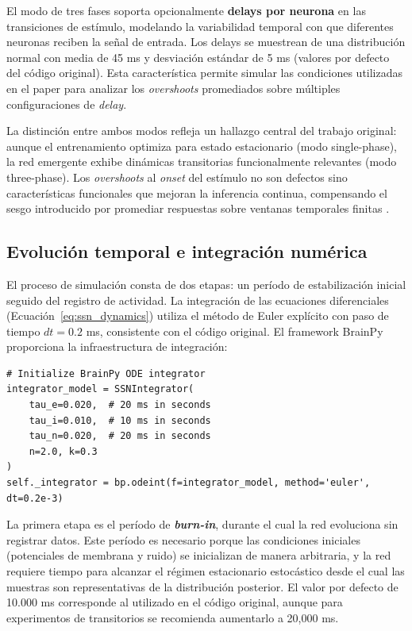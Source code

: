 El modo de tres fases soporta opcionalmente \textbf{delays por neurona} en las transiciones de estímulo, modelando la variabilidad temporal con que diferentes neuronas reciben la señal de entrada. Los delays se muestrean de una distribución normal con media de 45 ms y desviación estándar de 5 ms (valores por defecto del código original). Esta característica permite simular las condiciones utilizadas en el paper para analizar los \textit{overshoots} promediados sobre múltiples configuraciones de \textit{delay}.

La distinción entre ambos modos refleja un hallazgo central del trabajo original: aunque el entrenamiento optimiza para estado estacionario (modo single-phase), la red emergente exhibe dinámicas transitorias funcionalmente relevantes (modo three-phase). Los \textit{overshoots} al \textit{onset} del estímulo no son defectos sino características funcionales que mejoran la inferencia continua, compensando el sesgo introducido por promediar respuestas sobre ventanas temporales finitas \citep{echeveste2020cortical}.

\subsection{Evolución temporal e integración numérica}
\label{subsec:impl_evolucion}

El proceso de simulación consta de dos etapas: un período de estabilización inicial seguido del registro de actividad. La integración de las ecuaciones diferenciales (Ecuación~\ref{eq:ssn_dynamics}) utiliza el método de Euler explícito con paso de tiempo $dt = 0.2$ ms, consistente con el código original. El framework BrainPy proporciona la infraestructura de integración:

\begin{code}
\begin{verbatim}
# Initialize BrainPy ODE integrator
integrator_model = SSNIntegrator(
    tau_e=0.020,  # 20 ms in seconds
    tau_i=0.010,  # 10 ms in seconds
    tau_n=0.020,  # 20 ms in seconds
    n=2.0, k=0.3
)
self._integrator = bp.odeint(f=integrator_model, method='euler', dt=0.2e-3)
\end{verbatim}
\caption{Inicialización del integrador numérico con BrainPy.}
\label{code:brainpy_integrator}
\end{code}
\vspace{1.5em}

La primera etapa es el período de \textbf{\textit{burn-in}}, durante el cual la red evoluciona sin registrar datos. Este período es necesario porque las condiciones iniciales (potenciales de membrana y ruido) se inicializan de manera arbitraria, y la red requiere tiempo para alcanzar el régimen estacionario estocástico desde el cual las muestras son representativas de la distribución posterior. El valor por defecto de 10.000 ms corresponde al utilizado en el código original, aunque para experimentos de transitorios se recomienda aumentarlo a 20,000 ms.


